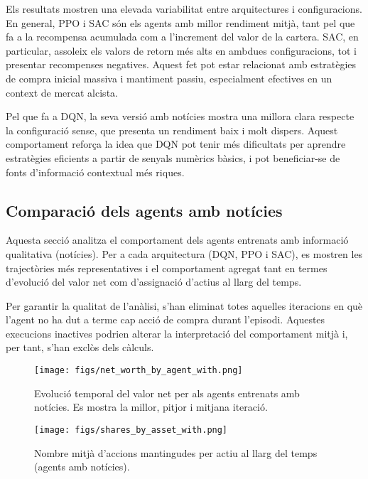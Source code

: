 \documentclass[12pt,a4paper,twoside]{book}
\begin{document}
Els resultats mostren una elevada variabilitat entre arquitectures i configuracions. En general, PPO i SAC són els agents amb millor rendiment mitjà, tant pel que fa a la recompensa acumulada com a l'increment del valor de la cartera. SAC, en particular, assoleix els valors de retorn més alts en ambdues configuracions, tot i presentar recompenses negatives. Aquest fet pot estar relacionat amb estratègies de compra inicial massiva i mantiment passiu, especialment efectives en un context de mercat alcista.

Pel que fa a DQN, la seva versió amb notícies mostra una millora clara respecte la configuració sense, que presenta un rendiment baix i molt dispers. Aquest comportament reforça la idea que DQN pot tenir més dificultats per aprendre estratègies eficients a partir de senyals numèrics bàsics, i pot beneficiar-se de fonts d’informació contextual més riques.

\subsection{Comparació dels agents amb notícies}

Aquesta secció analitza el comportament dels agents entrenats amb informació qualitativa (notícies). Per a cada arquitectura (DQN, PPO i SAC), es mostren les trajectòries més representatives i el comportament agregat tant en termes d’evolució del valor net com d’assignació d’actius al llarg del temps.

Per garantir la qualitat de l’anàlisi, s’han eliminat totes aquelles iteracions en què l’agent no ha dut a terme cap acció de compra durant l’episodi. Aquestes execucions inactives podrien alterar la interpretació del comportament mitjà i, per tant, s’han exclòs dels càlculs.

\begin{figure}[H]
\centering
\texttt{[image: figs/net\_worth\_by\_agent\_with.png]}
\caption{Evolució temporal del valor net per als agents entrenats amb notícies. Es mostra la millor, pitjor i mitjana iteració.}
\label{fig:networth-news}
\end{figure}

\begin{figure}[H]
\centering
\texttt{[image: figs/shares\_by\_asset\_with.png]}
\caption{Nombre mitjà d'accions mantingudes per actiu al llarg del temps (agents amb notícies).}
\label{fig:shares-news}
\end{figure}
\end{document}
